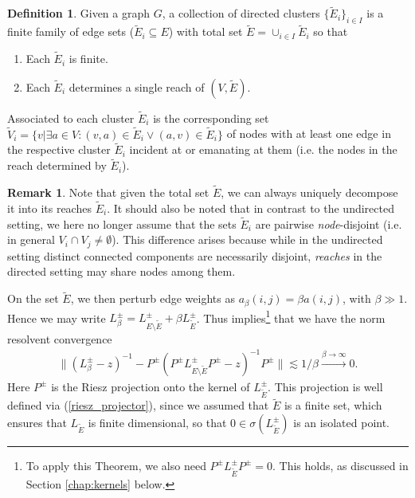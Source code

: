 \documentclass[reqno,12pt,letterpaper]{amsart}
\numberwithin{equation}{section}
\newcommand{\Lio}{L^{\pm}}
\newcommand{\1}{\mathds{1}}
\theoremstyle{definition}
\newtheorem{Def}[Th]{Definition}
\newtheorem{Rem}[Th]{Remark}
\begin{document}
 	\begin{Def}\label{directed_clusters} Given a graph $G$, a collection of directed clusters $\{\tilde E_i\}_{i \in I}$ is a finite family  of edge sets ($\tilde E_i \subseteq E$) with total set $\tilde{E} = \cup_{i \in I} \tilde{E}_i$ so that 
 	\begin{enumerate}[label=(\roman*), topsep=0pt, itemsep=-1em]
 		\item Each $\tilde E_i$ is finite.\\ 
 		\item Each $\tilde E_i$ determines a single reach of $(V,\tilde{E})$.
 	\end{enumerate}
 	Associated to each cluster $\tilde E_i$ is the corresponding set $\tilde{V}_i =  \{v| \exists a \in V: (v,a) \in \tilde E_i \lor (a,v) \in \tilde E_i \}$ of nodes with at least one edge  in the respective cluster $\tilde{E}_i$ incident at or emanating at them (i.e. the nodes in the reach determined by $\tilde E_i$).
 \end{Def}
 \begin{Rem}
 Note that given the total set $\tilde{E}$, we can always uniquely decompose it into its reaches $\tilde{E}_i$. It should also be noted that in contrast to the undirected setting, we here no longer assume that the sets $\tilde{E}_i$ are pairwise \emph{node}-disjoint (i.e. in general $V_i \cap V_j \neq \emptyset$). This difference arises because while in the undirected setting distinct connected components are necessarily disjoint, \emph{reaches} in the directed setting may share nodes among them.
  \end{Rem}
 
 
 
 \medskip
 
 On the set $\tilde{E}$, we then perturb edge weights as  $a_\beta(i,j) = \beta a(i,j)$, with $\beta \gg 1$.
 Hence we may write 
 $
 	\Lio_\beta = \Lio_{E \setminus \tilde{E}} + \beta \Lio_{\tilde{E}}
$.
 Thus \cite[Theorem 3.12]{koke2026coupling}
  implies\footnote{To apply this Theorem, we also need $P^\pm \Lio_{\tilde{E}}P^\pm = 0$. This holds,  as discussed in Section \ref{chap:kernels} below.} that we have the norm resolvent convergence 
 \begin{align}\label{initial_dir_conv}
 	\|(\Lio_\beta - z)^{-1} - P^\pm (P^\pm \Lio_{E \setminus \tilde{E}}P^\pm - z)^{-1}  P^\pm \| \lesssim 1/\beta \xrightarrow{\beta \rightarrow \infty} 0.
 \end{align}
Here $P^\pm$ is the Riesz projection onto the kernel of $\Lio_{\tilde{E}}$. This projection is well defined via (\ref{riesz_projector}), since we assumed that $\tilde{E}$ is a finite set, which
ensures that  $L_{\tilde{E}}$ is  finite dimensional, so
that $0\in \sigma(L^\pm_{\tilde{E}})$ is an isolated point.
\end{document}
